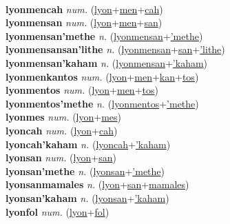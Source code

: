  \label{lyonmenmes} \\
\textbf{lyonmencah} \textit{num.} (\hyperref[lyon]{lyon}+\hyperref[men]{men}+\hyperref[cah]{cah})
 \label{lyonmencah} \\
\textbf{lyonmensan} \textit{num.} (\hyperref[lyon]{lyon}+\hyperref[men]{men}+\hyperref[san]{san})
 \label{lyonmensan} \\
\textbf{lyonmensan'methe} \textit{n.} (\hyperref[lyonmensan]{lyonmensan}+\hyperref['methe]{'methe})
 \label{lyonmensan'methe} \\
\textbf{lyonmensansan'lithe} \textit{n.} (\hyperref[lyonmensan]{lyonmensan}+\hyperref[san]{san}+\hyperref['lithe]{'lithe})
 \label{lyonmensansan'lithe} \\
\textbf{lyonmensan'kaham} \textit{n.} (\hyperref[lyonmensan]{lyonmensan}+\hyperref['kaham]{'kaham})
 \label{lyonmensan'kaham} \\
\textbf{lyonmenkantos} \textit{num.} (\hyperref[lyon]{lyon}+\hyperref[men]{men}+\hyperref[kan]{kan}+\hyperref[tos]{tos})
 \label{lyonmenkantos} \\
\textbf{lyonmentos} \textit{num.} (\hyperref[lyon]{lyon}+\hyperref[men]{men}+\hyperref[tos]{tos})
 \label{lyonmentos} \\
\textbf{lyonmentos'methe} \textit{n.} (\hyperref[lyonmentos]{lyonmentos}+\hyperref['methe]{'methe})
 \label{lyonmentos'methe} \\
\textbf{lyonmes} \textit{num.} (\hyperref[lyon]{lyon}+\hyperref[mes]{mes})
 \label{lyonmes} \\
\textbf{lyoncah} \textit{num.} (\hyperref[lyon]{lyon}+\hyperref[cah]{cah})
 \label{lyoncah} \\
\textbf{lyoncah'kaham} \textit{n.} (\hyperref[lyoncah]{lyoncah}+\hyperref['kaham]{'kaham})
 \label{lyoncah'kaham} \\
\textbf{lyonsan} \textit{num.} (\hyperref[lyon]{lyon}+\hyperref[san]{san})
 \label{lyonsan} \\
\textbf{lyonsan'methe} \textit{n.} (\hyperref[lyonsan]{lyonsan}+\hyperref['methe]{'methe})
 \label{lyonsan'methe} \\
\textbf{lyonsanmamales} \textit{n.} (\hyperref[lyon]{lyon}+\hyperref[san]{san}+\hyperref[mamales]{mamales})
 \label{lyonsanmamales} \\
\textbf{lyonsan'kaham} \textit{n.} (\hyperref[lyonsan]{lyonsan}+\hyperref['kaham]{'kaham})
 \label{lyonsan'kaham} \\
\textbf{lyonfol} \textit{num.} (\hyperref[lyon]{lyon}+\hyperref[fol]{fol})
 \label{lyonfol} \\
